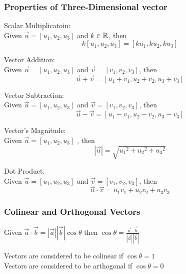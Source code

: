 \subsubsection{Properties of Three-Dimensional vector}
Scalar Multiplicatoin:\\
Given $\vec{u} = \left[u_1, u_2, u_3\right]$ and $k \in \mathbb{R}$, then 
$$k\left[u_1, u_2, u_3\right] = \left[ku_1, ku_2, ku_3\right]$$

\noindent Vector Addition:\\
Given $\vec{u} = \left[u_1, u_2, u_3\right]$ and $\vec{v} = \left[v_1, v_2, v_3\right]$, then 
$$\vec{u} + \vec{v} = \left[u_1 + v_1, u_2 + v_2, u_3 + v_3\right]$$

\noindent Vector Subtraction:\\
Given $\vec{u} = \left[u_1, u_2, u_3\right]$ and $\vec{v} = \left[v_1, v_2, v_3\right]$, then 
$$\vec{u} - \vec{v} = \left[u_1 - v_1, u_2 - v_2, u_3 - v_3\right]$$

\noindent Vector's Magnitude:\\
Given $\vec{u} = \left[u_1, u_2, u_3\right]$ , then 
$$\left|\vec{u}\right| = \sqrt{{u_1}^2 + {u_2}^2 + {u_3}^2}$$

\noindent Dot Product:\\
Given $\vec{u} = \left[u_1, u_2, u_3\right]$ and $\vec{v} = \left[v_1, v_2, v_3\right]$, then 
$$\vec{u} \cdot \vec{v} = u_1v_1 + u_2v_2 + u_3v_3$$

\subsubsection{Colinear and Orthogonal Vectors}
Given $\vec{a} \cdot \vec{b} = \left|\vec{a}\right|\left|\vec{b}\right|\cos \theta$ then 
$\cos \theta = \frac{\vec{a} \cdot \vec{b}}{\left|\vec{a}\right|\left|\vec{b}\right|}$

Vectors are considered to be colinear if $\cos \theta = 1$ \\

Vectors are considered to be arthogonal if $\cos \theta = 0$

\newpage